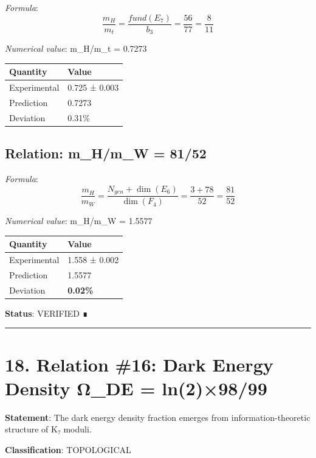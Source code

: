 \documentclass[11pt,a4paper]{article}
\begin{document}
\emph{Formula}: \[\frac{m_H}{m_t} = \frac{fund(E_7)}{b_3} = \frac{56}{77} = \frac{8}{11}\]

\emph{Numerical value}: m\_\allowbreak{}H/m\_\allowbreak{}t = 0.7273

\begin{longtable}[]{@{}ll@{}}
\toprule\noalign{}
Quantity & Value \\
\midrule\noalign{}
\endhead
\bottomrule\noalign{}
\endlastfoot
Experimental & 0.725 ± 0.003 \\
Prediction & 0.7273 \\
Deviation & 0.31\% \\
\end{longtable}

\subsection{Relation: m\_\allowbreak{}H/m\_\allowbreak{}W = 81/52}\label{relation-m_hm_w-8152}

\emph{Formula}: \[\frac{m_H}{m_W} = \frac{N_{gen} + \dim(E_6)}{\dim(F_4)} = \frac{3 + 78}{52} = \frac{81}{52}\]

\emph{Numerical value}: m\_\allowbreak{}H/m\_\allowbreak{}W = 1.5577

\begin{longtable}[]{@{}ll@{}}
\toprule\noalign{}
Quantity & Value \\
\midrule\noalign{}
\endhead
\bottomrule\noalign{}
\endlastfoot
Experimental & 1.558 ± 0.002 \\
Prediction & 1.5577 \\
Deviation & \textbf{0.02\%} \\
\end{longtable}

\textbf{Status}: VERIFIED ∎

\begin{center}\rule{\linewidth}{0.5pt}\end{center}

\section{18. Relation \#16: Dark Energy Density Ω\_\allowbreak{}DE = ln(2)×98/99}\label{relation-16-dark-energy-density-ux3c9_de-ln29899}

\textbf{Statement}: The dark energy density fraction emerges from information-theoretic structure of K₇ moduli.

\textbf{Classification}: TOPOLOGICAL
\end{document}
